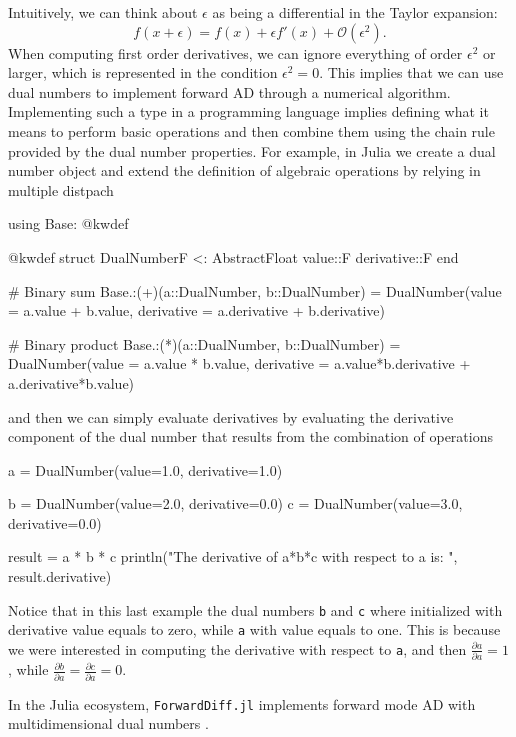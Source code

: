 Intuitively, we can think about $\epsilon$ as being a differential in the Taylor expansion:
\begin{equation}
 f(x + \epsilon) = f(x) + \epsilon f'(x) + \mathcal O (\epsilon^2).
\end{equation}
When computing first order derivatives, we can ignore everything of order $\epsilon^2$ or larger, which is represented in the condition $\epsilon^2 = 0$.
This implies that we can use dual numbers to implement forward AD through a numerical algorithm. Implementing such a type in a programming language implies defining what it means to perform basic operations and then combine them using the chain rule provided by the dual number properties.
For example, in Julia we create a dual number object and extend the definition of algebraic operations by relying in multiple distpach
\begin{jllisting}
using Base: @kwdef

@kwdef struct DualNumber{F <: AbstractFloat}
    value::F
    derivative::F
end

# Binary sum
Base.:(+)(a::DualNumber, b::DualNumber) = DualNumber(value = a.value + b.value, derivative = a.derivative + b.derivative)

# Binary product 
Base.:(*)(a::DualNumber, b::DualNumber) = DualNumber(value = a.value * b.value, derivative = a.value*b.derivative + a.derivative*b.value)
\end{jllisting}
and then we can simply evaluate derivatives by evaluating the derivative component of the dual number that results from the combination of operations
\begin{jllisting}
a = DualNumber(value=1.0, derivative=1.0)

b = DualNumber(value=2.0, derivative=0.0)
c = DualNumber(value=3.0, derivative=0.0)

result = a * b * c
println("The derivative of a*b*c with respect to a is: ", result.derivative)
\end{jllisting}
Notice that in this last example the dual numbers \texttt{b} and \texttt{c} where initialized with derivative value equals to zero, while \texttt{a} with value equals to one. 
This is because we were interested in computing the derivative with respect to \texttt{a}, and then $\frac{\partial a}{\partial a} = 1$, while $\frac{\partial b}{\partial a} = \frac{\partial c}{\partial a} = 0$. 

In the Julia ecosystem, \texttt{ForwardDiff.jl} implements forward mode AD with multidimensional dual numbers \cite{RevelsLubinPapamarkou2016}.

